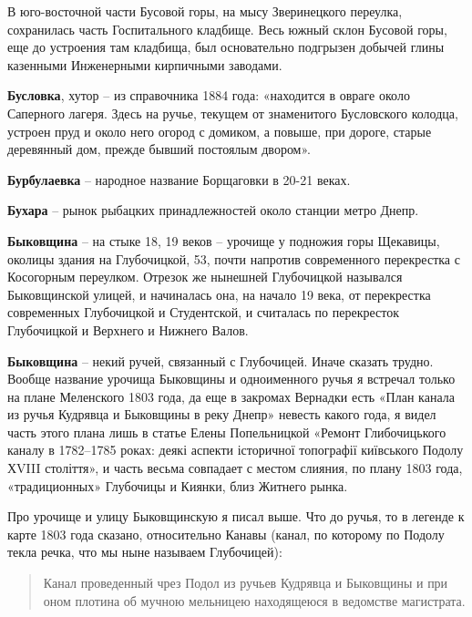 В юго-восточной части Бусовой горы, на мысу Зверинецкого переулка, сохранилась часть Госпитального кладбище. Весь южный склон Бусовой горы, еще до устроения там кладбища, был основательно подгрызен добычей глины казенными Инженерными кирпичными заводами.\\ 

\medskip

\textbf{Бусловка}, хутор – из справочника 1884 года: «находится в овраге около Саперного лагеря. Здесь на ручье, текущем от знаменитого Бусловского колодца, устроен пруд и около него огород с домиком, а повыше, при дороге, старые деревянный дом, прежде бывший постоялым двором».\\
\medskip

\textbf{Бурбулаевка} – народное название Борщаговки в 20-21 веках.\\

\medskip

\textbf{Бухара} – рынок рыбацких принадлежностей около станции метро Днепр.\\

\medskip

\textbf{Быковщина} – на стыке 18, 19 веков – урочище у подножия горы Щекавицы, околицы здания на Глубочицкой, 53, почти напротив современного перекрестка с Косогорным переулком. Отрезок же нынешней Глубочицкой назывался Быковщинской улицей, и начиналась она, на начало 19 века, от перекрестка современных Глубочицкой и Студентской, и считалась по перекресток Глубочицкой и Верхнего и Нижнего Валов.\\

\medskip

\textbf{Быковщина} – некий ручей, связанный с Глубочицей. Иначе сказать трудно. Вообще название урочища Быковщины и одноименного ручья я встречал только на плане Меленского 1803 года, да еще в закромах Вернадки есть «План канала из ручья Кудрявца и Быковщины в реку Днепр» невесть какого года, я видел часть этого плана лишь в статье Елены Попельницкой «Ремонт Глибочицького каналу в 1782–1785 роках: деякі аспекти історичної топографії київського Подолу ХVIII століття», и часть весьма совпадает с местом слияния, по плану 1803 года, «традиционных» Глубочицы и Киянки, близ Житнего рынка.

Про урочище и улицу Быковщинскую я писал выше. Что до ручья, то в легенде к карте 1803 года сказано, относительно Канавы (канал, по которому по Подолу текла речка, что мы ныне называем Глубочицей):

\begin{quotation}
Канал проведенный чрез Подол из ручьев Кудрявца и Быковщины и при оном плотина об мучною мельницею находящеюся в ведомстве магистрата.
\end{quotation}

